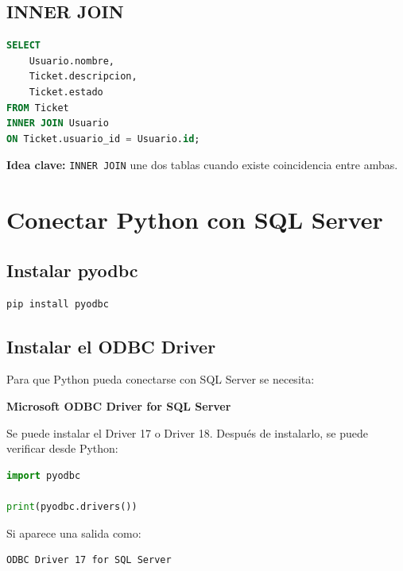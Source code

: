 \documentclass[12pt]{article}
\begin{document}
\subsection{INNER JOIN}

\begin{lstlisting}[language=SQL]
SELECT 
    Usuario.nombre,
    Ticket.descripcion,
    Ticket.estado
FROM Ticket
INNER JOIN Usuario
ON Ticket.usuario_id = Usuario.id;
\end{lstlisting}

\textbf{Idea clave:} \texttt{INNER JOIN} une dos tablas cuando existe coincidencia entre ambas.

\section{Conectar Python con SQL Server}

\subsection{Instalar pyodbc}

\begin{lstlisting}
pip install pyodbc
\end{lstlisting}

\subsection{Instalar el ODBC Driver}

Para que Python pueda conectarse con SQL Server se necesita:

\begin{center}
\textbf{Microsoft ODBC Driver for SQL Server}
\end{center}

Se puede instalar el Driver 17 o Driver 18. Después de instalarlo, se puede verificar desde Python:

\begin{lstlisting}[language=Python]
import pyodbc

print(pyodbc.drivers())
\end{lstlisting}

Si aparece una salida como:

\begin{lstlisting}
ODBC Driver 17 for SQL Server
\end{lstlisting}
\end{document}
